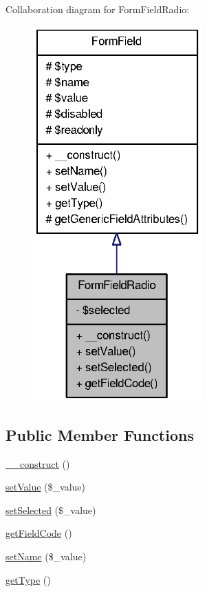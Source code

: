 Collaboration diagram for FormFieldRadio:\nopagebreak
\begin{figure}[H]
\begin{center}
\leavevmode
\includegraphics[width=184pt]{classFormFieldRadio__coll__graph}
\end{center}
\end{figure}
\subsection*{Public Member Functions}
\begin{DoxyCompactItemize}
\item 
\hyperlink{classFormFieldRadio_ae82224cf68e3513e29923c24f42eb06d}{\_\-\_\-construct} ()
\item 
\hyperlink{classFormFieldRadio_aab105e92866fd80890d3254f51a2e4ca}{setValue} (\$\_\-value)
\item 
\hyperlink{classFormFieldRadio_a2fc7c97f763930e5bdd8f7cbb7f3c98f}{setSelected} (\$\_\-value)
\item 
\hyperlink{classFormFieldRadio_a727e6c7c77ed0e2b49108d0e44c6e8d3}{getFieldCode} ()
\item 
\hyperlink{classFormField_ad57e32bd53170af060e869b3b60f0ef7}{setName} (\$\_\-value)
\item 
\hyperlink{classFormField_a1f64b737bccb6b2827f8c5665b9920c7}{getType} ()
\end{DoxyCompactItemize}
